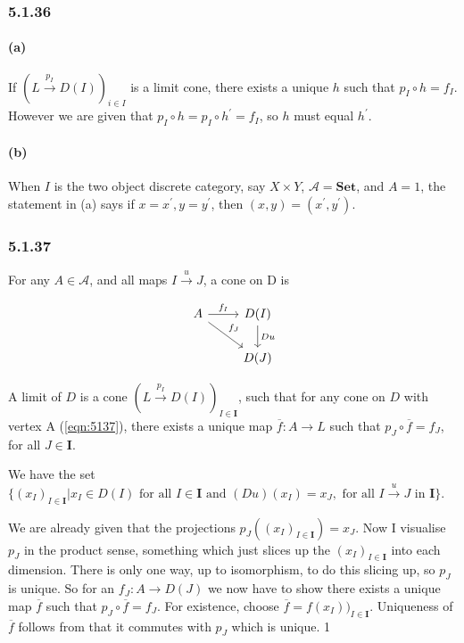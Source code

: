 \documentclass{article}
\begin{document}
\subsubsection*{5.1.36}

\paragraph{(a)}

If $(L \xrightarrow{p_I} D(I))_{i \in I}$ is a limit cone, there exists a unique $h$ such that $p_I \circ h = f_I$. However we are given that $p_I \circ h = p_I \circ h^\prime = f_I$, so $h$ must equal $h^\prime$.

\paragraph{(b)}

When $I$ is the two object discrete category, say $X \times Y$, $\mathcal{A}=\mathbf{Set}$, and $A=1$, the statement in (a) says if $x = x^\prime, y = y^\prime$, then $(x, y) = (x^\prime, y^\prime)$.

\subsubsection*{5.1.37}

For any $A \in \mathcal{A}$, and all maps $I \xrightarrow{u} J$, a cone on D is

\begin{equation}
\label{eqn:5137}
\begin{tikzcd}
A \arrow{r}{f_I} \arrow{rd}{f_J}
  & D(I) \arrow{d}{Du} \\
    & D(J)
  \end{tikzcd}
\end{equation}

A limit of $D$ is a cone $(L \xrightarrow{p_I} D(I))_{I \in \mathbf{I}}$, such that for any cone on $D$ with vertex A (\ref{eqn:5137}), there exists a unique map $\overline{f}\colon A \rightarrow L$ such that $p_J \circ \overline{f} = f_J$, for all $J \in \mathbf{I}$.

We have the set $\{ (x_I)_{I \in \mathbf{I}} | x_I \in D(I) \text{ for all } I\in \mathbf{I} \text{ and } (Du)(x_I)=x_J, \text{ for all } I \xrightarrow{u} J \text{ in } \mathbf{I} \}.$

We are already given that the projections $p_J((x_I)_{I \in \mathbf{I}}) = x_J$. Now I visualise $p_J$ in the product sense, something which just slices up the $(x_I)_{I \in \mathbf{I}}$ into each dimension. There is only one way, up to isomorphism, to do this slicing up, so $p_J$ is unique. So for an $f_J\colon A \rightarrow D(J)$ we now have to show there exists a unique map $\overline{f}$ such that $p_J \circ \overline{f} = f_J$. For existence, choose $\overline{f}=f(x_I))_{I \in \mathbf{I}}$. Uniqueness of $\overline{f}$ follows from that it commutes with $p_J$ which is unique.
1
\end{document}
